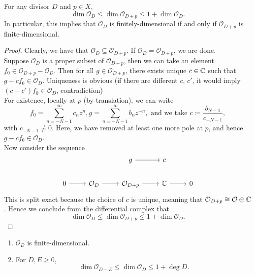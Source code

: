 \documentclass{article}
\begin{document}
{\begin{lemma}
    For any divisor $D$ and $p \in X$,
    \[\dim \mathcal{O}_D \leq \dim \mathcal{O}_{D + p} \leq 1 + \dim \mathcal{O}_D.\]
    In particular, this implies that $\mathcal{O}_D$ is finitely-dimensional if and only if $\mathcal{O}_{D+p}$ is finite-dimensional.
\end{lemma}

\begin{proof}
    Clearly, we have that $\mathcal{O}_{D} \subseteq \mathcal{O}_{D+p}$. If $\mathcal{O}_D = \mathcal{O}_{D+p}$, we are done.\\
    
    Suppose $\mathcal{O}_D$ is a proper subset of $\mathcal{O}_{D+p}$, then we can take an element $f_0 \in \mathcal{O}_{D+p} - \mathcal{O}_D$. Then for all $g \in \mathcal{O}_{D+p}$, there exists unique $c \in \mathbb{C}$ such that $g - c f_0 \in \mathcal{O}_D$. Uniqueness is obvious (if there are different $c$, $c'$, it would imply $(c - c') f_0 \in \mathcal{O}_D$, contradiction)\\

    For existence, locally at $p$ (by translation), we can write
    \[f_0 = \sum_{n=-N-1}^\infty c_n z^n, g = \sum_{n=-N-1}^\infty b_n z^{-n}, \text{ and we take } c \coloneqq \frac{b_{N-1}}{c_{-N-1}},\]
    with $c_{-N-1} \neq 0$. Here, we have removed at least one more pole at $p$, and hence $g - c f_0 \in \mathcal{O}_D$.\\

    Now consider the sequence
\[\begin{tikzcd}
	&& g & c \\
	0 & {\mathcal{O}_{D}} & {\mathcal{O}_{D+p}} & \Cbb & 0
	\arrow[from=2-1, to=2-2]
	\arrow[from=2-2, to=2-3]
	\arrow[from=2-3, to=2-4]
	\arrow[from=2-4, to=2-5]
	\arrow[from=1-3, to=1-4]
\end{tikzcd}\]
This is split exact because the choice of $c$ is unique, meaning that $\mathcal{O}_{D+p} \cong \mathcal{O} \oplus \mathbb{C}$. Hence we conclude from the differential complex that 
 \[\dim \mathcal{O}_D \leq \dim \mathcal{O}_{D + p} \leq 1 + \dim \mathcal{O}_D.\]
\end{proof}

\begin{corollary}
    \begin{enumerate}
        \item $\mathcal{O}_D$ is finite-dimensional.
        \item For $D, E \geq 0$, 
        \[\dim \mathcal{O}_{D-E} \leq \dim \mathcal{O}_D \leq 1 + \deg D.\]
    \end{enumerate}
\end{corollary}

}
\end{document}
